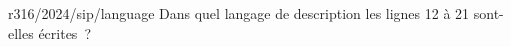 \begin{question}{r316/2024/sip/language}
  Dans quel langage de description les lignes 12 à 21 sont-elles
  écrites~?
  \begin{reponses}
    \lastchoices
  \end{reponses}
\end{question}